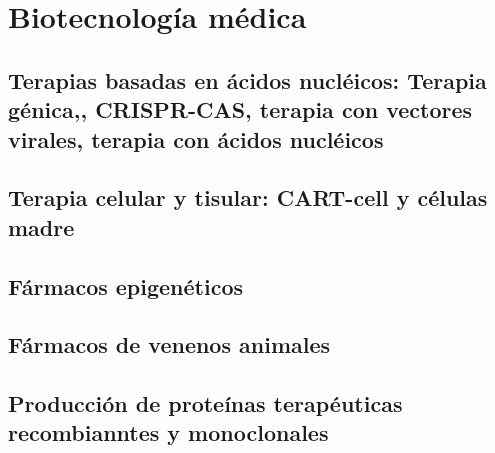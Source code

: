 \documentclass{../Resume}
\begin{document}
\part{Biotecnología médica}

    \chapter{Terapias basadas en ácidos nucléicos: Terapia génica,, CRISPR-CAS, terapia con vectores virales, terapia con ácidos nucléicos}
    \chapter{Terapia celular y tisular: CART-cell y células madre}
    \chapter{Fármacos epigenéticos}
    \chapter{Fármacos de venenos animales}
    \chapter{Producción de proteínas terapéuticas recombianntes y monoclonales}


\newpage


\end{document}
